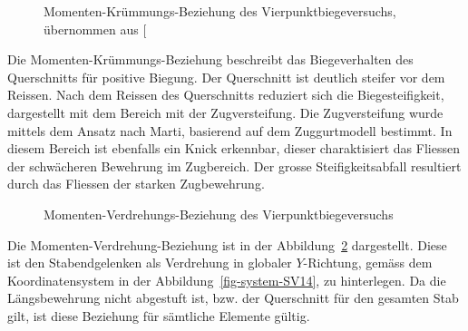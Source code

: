 \documentclass[
  11pt,
  letterpaper,
]{scrreprt}
\begin{document}
\begin{figure}[H]


\caption{\label{fig-mchi_sv14}Momenten-Krümmungs-Beziehung des
Vierpunktbiegeversuchs, übernommen aus
{[}\citeproc{ref-gitz_ansatze_2024}{1}{]}}

\end{figure}%

Die Momenten-Krümmungs-Beziehung beschreibt das Biegeverhalten des
Querschnitts für positive Biegung. Der Querschnitt ist deutlich steifer
vor dem Reissen. Nach dem Reissen des Querschnitts reduziert sich die
Biegesteifigkeit, dargestellt mit dem Bereich mit der Zugversteifung.
Die Zugversteifung wurde mittels dem Ansatz nach Marti, basierend auf
dem Zuggurtmodell bestimmt. In diesem Bereich ist ebenfalls ein Knick
erkennbar, dieser charaktisiert das Fliessen der schwächeren Bewehrung
im Zugbereich. Der grosse Steifigkeitsabfall resultiert durch das
Fliessen der starken Zugbewehrung.

\begin{figure}[H]


\caption{\label{fig-mphi_sv14}Momenten-Verdrehungs-Beziehung des
Vierpunktbiegeversuchs}

\end{figure}%

Die Momenten-Verdrehung-Beziehung ist in der
Abbildung~\ref{fig-mphi_sv14} dargestellt. Diese ist den Stabendgelenken
als Verdrehung in globaler \(Y\)-Richtung, gemäss dem Koordinatensystem
in der Abbildung~\ref{fig-system-SV14}, zu hinterlegen. Da die
Längsbewehrung nicht abgestuft ist, bzw. der Querschnitt für den
gesamten Stab gilt, ist diese Beziehung für sämtliche Elemente gültig.
\end{document}

